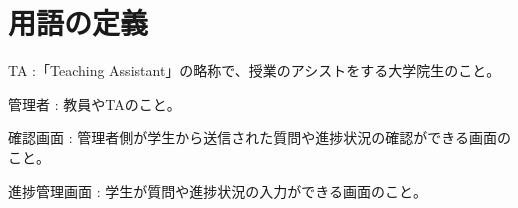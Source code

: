 \documentclass[a4j,titlepage]{ujarticle}
\begin{document}
\section{用語の定義}
TA :「Teaching Assistant」の略称で、授業のアシストをする大学院生のこと。

管理者 : 教員やTAのこと。

確認画面 : 管理者側が学生から送信された質問や進捗状況の確認ができる画面のこと。

進捗管理画面 : 学生が質問や進捗状況の入力ができる画面のこと。
\end{document}
